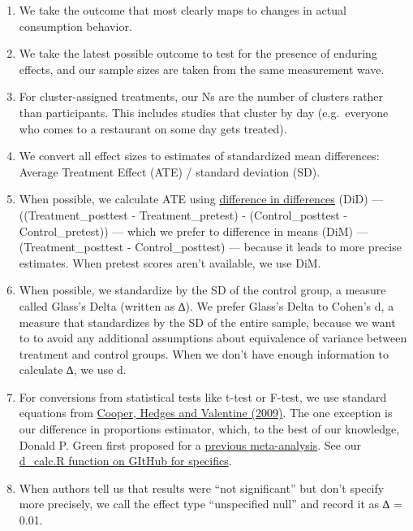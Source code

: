 \documentclass[
  letterpaper,
  DIV=11,
  numbers=noendperiod]{scrartcl}
\providecommand{\tightlist}{%
  \setlength{\itemsep}{0pt}\setlength{\parskip}{0pt}}\usepackage{longtable,booktabs,array}
\begin{document}
\begin{enumerate}
\def\labelenumi{\arabic{enumi}.}
\tightlist
\item
  We take the outcome that most clearly maps to changes in actual
  consumption behavior.
\item
  We take the latest possible outcome to test for the presence of
  enduring effects, and our sample sizes are taken from the same
  measurement wave.
\item
  For cluster-assigned treatments, our Ns are the number of clusters
  rather than participants. This includes studies that cluster by day
  (e.g.~everyone who comes to a restaurant on some day gets treated).
\item
  We convert all effect sizes to estimates of standardized mean
  differences: Average Treatment Effect (ATE) / standard deviation (SD).
\item
  When possible, we calculate ATE using
  \href{https://edge.edx.org/assets/courseware/v1/b8d2a8030b7aa5f2762a464bf7f8b0c7/c4x/BerkeleyX/CEGA101AIE/asset/Module_2.5_Difference_in_Differences.pdf}{difference
  in differences} (DiD) --- ((Treatment\_posttest - Treatment\_pretest)
  - (Control\_posttest - Control\_pretest)) --- which we prefer to
  difference in means (DiM) --- (Treatment\_posttest -
  Control\_posttest) --- because it leads to more precise estimates.
  When pretest scores aren't available, we use DiM.
\item
  When possible, we standardize by the SD of the control group, a
  measure called Glass's Delta (written as ∆). We prefer Glass's Delta
  to Cohen's d, a measure that standardizes by the SD of the entire
  sample, because we want to to avoid any additional assumptions about
  equivalence of variance between treatment and control groups. When we
  don't have enough information to calculate ∆, we use d.
\item
  For conversions from statistical tests like t-test or F-test, we use
  standard equations from
  \href{https://psycnet.apa.org/record/2009-05060-000}{Cooper, Hedges
  and Valentine (2009)}. The one exception is our difference in
  proportions estimator, which, to the best of our knowledge, Donald P.
  Green first proposed for a
  \href{https://doi.org/10.1146/annurev-psych-071620-030619}{previous
  meta-analysis}. See our
  \href{https://github.com/setgree/vegan-meta/blob/main/functions/d_calc.R}{d\_calc.R
  function on GItHub for specifics}.
\item
  When authors tell us that results were ``not significant'' but don't
  specify more precisely, we call the effect type ``unspecified null''
  and record it as ∆ = 0.01.
\end{enumerate}
\end{document}
